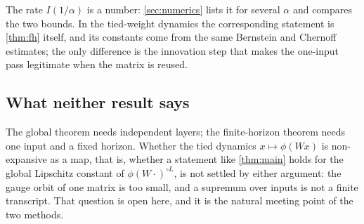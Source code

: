 The rate $I(1/\alpha)$ is a number: \cref{sec:numerics} lists it for several $\alpha$ and compares the two bounds. In the tied-weight dynamics the corresponding statement is \cref{thm:fh} itself, and its constants come from the same Bernstein and Chernoff estimates; the only difference is the innovation step that makes the one-input pass legitimate when the matrix is reused.

\subsection{What neither result says}

The global theorem needs independent layers; the finite-horizon theorem needs one input and a fixed horizon. Whether the tied dynamics $x\mapsto\phi(Wx)$ is non-expansive as a map, that is, whether a statement like \cref{thm:main} holds for the global Lipschitz constant of $\phi(W\cdot)^{\circ L}$, is not settled by either argument: the gauge orbit of one matrix is too small, and a supremum over inputs is not a finite transcript. That question is open here, and it is the natural meeting point of the two methods.
